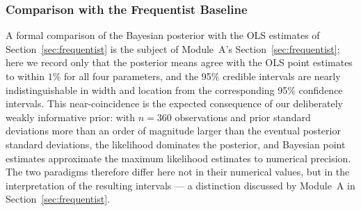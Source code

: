 \subsubsection{Comparison with the Frequentist Baseline}

A formal comparison of the Bayesian posterior with the OLS estimates of Section~\ref{sec:frequentist} is the subject of Module~A's Section~\ref{sec:frequentist}; here we record only that the posterior means agree with the OLS point estimates to within $1\%$ for all four parameters, and the 95\% credible intervals are nearly indistinguishable in width and location from the corresponding 95\% confidence intervals. This near-coincidence is the expected consequence of our deliberately weakly informative prior: with $n = 360$ observations and prior standard deviations more than an order of magnitude larger than the eventual posterior standard deviations, the likelihood dominates the posterior, and Bayesian point estimates approximate the maximum likelihood estimates to numerical precision. The two paradigms therefore differ here not in their numerical values, but in the interpretation of the resulting intervals --- a distinction discussed by Module~A in Section~\ref{sec:frequentist}.
